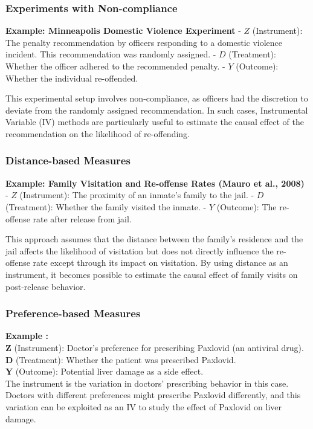 \subsubsection{Experiments with Non-compliance}  
\textbf{Example: Minneapolis Domestic Violence Experiment}  
- \textbf{\(Z\)} (Instrument): The penalty recommendation by officers responding to a domestic violence incident. This recommendation was randomly assigned.  
- \textbf{\(D\)} (Treatment): Whether the officer adhered to the recommended penalty.  
- \textbf{\(Y\)} (Outcome): Whether the individual re-offended.  

This experimental setup involves non-compliance, as officers had the discretion to deviate from the randomly assigned recommendation. In such cases, Instrumental Variable (IV) methods are particularly useful to estimate the causal effect of the recommendation on the likelihood of re-offending.  

\subsubsection{Distance-based Measures}  
\textbf{Example: Family Visitation and Re-offense Rates (Mauro et al., 2008)}  
- \textbf{\(Z\)} (Instrument): The proximity of an inmate’s family to the jail.  
- \textbf{\(D\)} (Treatment): Whether the family visited the inmate.  
- \textbf{\(Y\)} (Outcome): The re-offense rate after release from jail.  

This approach assumes that the distance between the family’s residence and the jail affects the likelihood of visitation but does not directly influence the re-offense rate except through its impact on visitation. By using distance as an instrument, it becomes possible to estimate the causal effect of family visits on post-release behavior.  

\subsubsection{Preference-based Measures}
\textbf{Example :} \\
\textbf{Z} (Instrument): Doctor’s preference for prescribing Paxlovid (an antiviral drug). \\
\textbf{D} (Treatment): Whether the patient was prescribed Paxlovid. \\
\textbf{Y} (Outcome): Potential liver damage as a side effect. \\

The instrument is the variation in doctors' prescribing behavior in this case. Doctors with different preferences might prescribe Paxlovid differently, and this variation can be exploited as an IV to study the effect of Paxlovid on liver damage.

